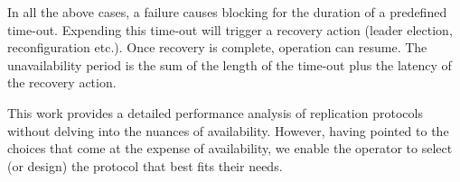 In all the above cases, a failure causes blocking for the duration of a predefined time-out. Expending this time-out will trigger a recovery action (\eg leader election, reconfiguration etc.). Once recovery is complete, operation can resume. 
The unavailability period is the sum of the length of the time-out plus the latency of the recovery action. 

This work provides a detailed performance analysis of replication protocols without delving into the nuances of availability. However, having pointed to the choices that come at the expense of availability, we enable the operator to select (or design) the protocol that best fits their needs.


